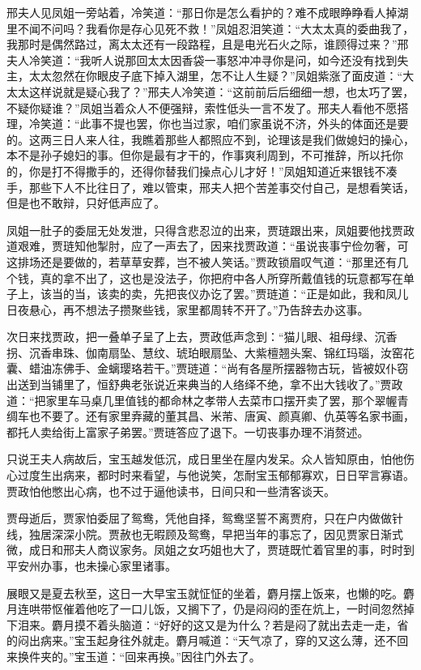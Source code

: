 \documentclass[12pt,oneside]{book}
\begin{document}
邢夫人见凤姐一旁站着，冷笑道：“那日你是怎么看护的？难不成眼睁睁看人掉湖里不闻不问吗？我看你是存心见死不救！”凤姐忍泪笑道：“大太太真的委曲我了，我那时是偶然路过，离太太还有一段路程，且是电光石火之际，谁顾得过来？”邢夫人冷笑道：“我听人说那回太太因香袋一事怒冲冲寻你是问，如今还没有找到失主，太太忽然在你眼皮子底下掉入湖里，怎不让人生疑？”凤姐紫涨了面皮道：“大太太这样说就是疑心我了？”邢夫人冷笑道：“这前前后后细细一想，也太巧了罢，不疑你疑谁？”凤姐当着众人不便强辩，索性低头一言不发了。邢夫人看他不愿搭理，冷笑道：“此事不提也罢，你也当过家，咱们家虽说不济，外头的体面还是要的。这两三日人来人往，我瞧着那些人都照应不到，论理该是我们做媳妇的操心，本不是孙子媳妇的事。但你是最有才干的，作事爽利周到，不可推辞，所以托你的，你是打不得撒手的，还得你替我们操点心儿才好！”凤姐知道近来银钱不凑手，那些下人不比往日了，难以管束，邢夫人把个苦差事交付自己，是想看笑话，但是也不敢辩，只好低声应了。

凤姐一肚子的委屈无处发泄，只得含悲忍泣的出来，贾琏跟出来，凤姐要他找贾政道艰难，贾琏知他掣肘，应了一声去了，因来找贾政道：“虽说丧事宁俭勿奢，可这排场还是要做的，若草草安葬，岂不被人笑话。”贾政锁眉叹气道：“那里还有几个钱，真的拿不出了，这也是没法子，你把府中各人所穿所戴值钱的玩意都写在单子上，该当的当，该卖的卖，先把丧仪办讫了罢。”贾琏道：“正是如此，我和凤儿日夜悬心，再不想法子攒聚些钱，家里都周转不开了。”乃告辞去办这事。

次日来找贾政，把一叠单子呈了上去，贾政低声念到：“猫儿眼、祖母绿、沉香拐、沉香串珠、伽南扇坠、慧纹、琥珀眼扇坠、大紫檀翘头案、锦红玛瑙，汝窑花囊、蜡油冻佛手、金螭璎珞若干。”贾琏道：“尚有各屋所摆器物古玩，皆被奴仆窃出送到当铺里了，恒舒典老张说近来典当的人络绎不绝，拿不出大钱收了。”贾政道：“把家里车马桌几里值钱的都命林之孝带人去菜市口摆开卖了罢，那个翠幄青绸车也不要了。还有家里弆藏的董其昌、米芾、唐寅、颜真卿、仇英等名家书画，都托人卖给街上富家子弟罢。”贾琏答应了退下。一切丧事办理不消赘述。

只说王夫人病故后，宝玉越发低沉，成日里坐在屋内发呆。众人皆知原由，怕他伤心过度生出病来，都时时来看望，与他说笑，怎耐宝玉郁郁寡欢，日日罕言寡语。贾政怕他憋出心病，也不过于逼他读书，日间只和一些清客谈天。

贾母逝后，贾家怕委屈了鸳鸯，凭他自择，鸳鸯坚誓不离贾府，只在户内做做针线，独居深深小院。贾赦也无暇顾及鸳鸯，早把当年的事忘了，因见贾家日渐式微，成日和邢夫人商议家务。凤姐之女巧姐也大了，贾琏既忙着官里的事，时时到平安州办事，也未操心家里诸事。

展眼又是夏去秋至，这日一大早宝玉就怔怔的坐着，麝月摆上饭来，也懒的吃。麝月连哄带怄催着他吃了一口儿饭，又搁下了，仍是闷闷的歪在炕上，一时间忽然掉下泪来。麝月摸不着头脑道：“好好的这又是为什么？若是闷了就出去走一走，省的闷出病来。”宝玉起身往外就走。麝月喊道：“天气凉了，穿的又这么薄，还不回来换件夹的。”宝玉道：“回来再换。”因往门外去了。
\end{document}

